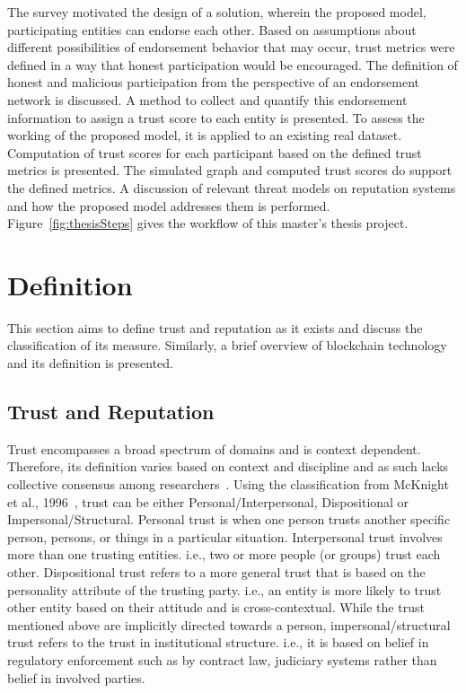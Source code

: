 The survey motivated the design of a solution, wherein the proposed model,
participating entities can endorse each other.  Based on assumptions about
different possibilities of endorsement behavior that may occur, trust metrics
were defined in a way that honest participation would be encouraged. The
definition of honest and malicious participation from the perspective of an
endorsement network is discussed. A method to collect and quantify this
endorsement information to assign a trust score to each entity is presented. To
assess the working of the proposed model, it is applied to an existing real
dataset. Computation of trust scores for each participant based on the defined
trust metrics is presented. The simulated graph and computed trust scores do
support the defined metrics. A discussion of relevant threat models on
reputation systems and how the proposed model addresses them is performed.
Figure~\ref{fig:thesisSteps} gives the workflow of this master's thesis
project.
\section{Definition}
This section aims to define trust and reputation as it exists and discuss the
classification of its measure. Similarly, a brief overview of blockchain
technology and its definition is presented. 


\subsection{Trust and Reputation}
Trust encompasses a broad spectrum of domains and is context dependent.
Therefore, its definition varies based on context and discipline and as such
lacks collective consensus among researchers~\cite{mcknight1996meanings}.
Using the classification from McKnight et al., 1996~\cite{mcknight2001trust},
trust can be either Personal/Interpersonal, Dispositional or
Impersonal/Structural.  Personal trust is when one person trusts another
specific person, persons, or things in a particular situation. Interpersonal
trust involves more than one trusting entities. i.e., two or more people (or
groups) trust each other.  Dispositional trust refers to a more general trust
that is based on the personality attribute of the trusting party. i.e., an
entity is more likely to trust other entity based on their attitude and is
cross-contextual. While the trust mentioned above are implicitly directed
towards a person, impersonal/structural trust refers to the trust in
institutional structure.  i.e., it is based on belief in regulatory enforcement
such as by contract law, judiciary systems rather than belief in involved
parties.\\

